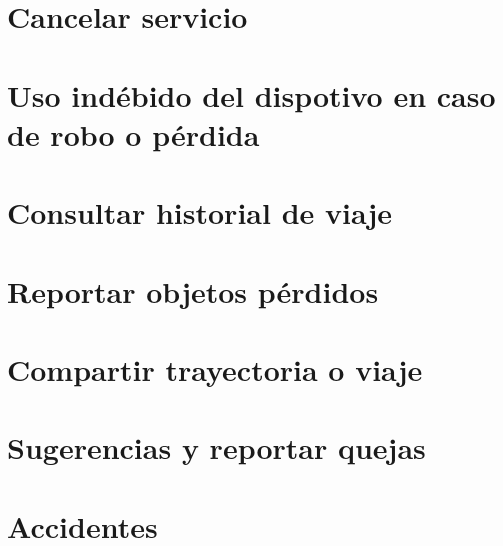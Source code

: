 \section{Cancelar servicio}

\section{Uso indébido del dispotivo en caso de robo o pérdida}

\section{Consultar historial de viaje}

\section{Reportar objetos pérdidos}

\section{Compartir trayectoria o viaje}

\section{Sugerencias y reportar quejas}

\section{Accidentes}


